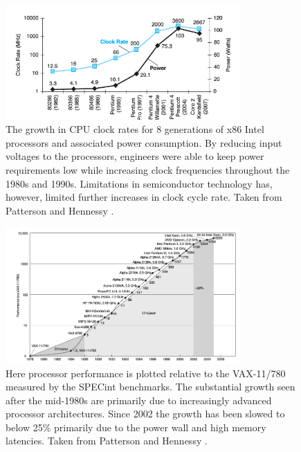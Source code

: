 \begin{figure}[ht!]
 \begin{mdframed}
  \centering
  \includegraphics[width=0.8\textwidth]{images/cpu_clocks.png}
  \caption[Power wall]{The growth in CPU clock rates for 8 generations of x86 Intel processors and associated power consumption. By reducing input voltages to the processors,
  engineers were able to keep power requirements low while increasing clock frequencies throughout the 1980s and 1990s. Limitations in semiconductor technology has, however,
  limited further increases in clock cycle rate. Taken from Patterson and Hennessy \cite[ch. 1]{patterson2009computer}.}
  \label{fig_clocks}
 \end{mdframed}
\end{figure}

\begin{figure}[ht!]
 \begin{mdframed}
  \centering
  \includegraphics[width=0.8\textwidth]{images/runtime_decrease_cpu.png}
  \caption[Program response time decline]{Here processor performance is plotted relative to the VAX-11/780 measured by the SPECint benchmarks. The substantial growth seen after the mid-1980s
  are primarily due to increasingly advanced processor architectures. Since 2002 the growth has been slowed to below 25\% primarily due to the power wall and high memory latencies. Taken from Patterson and Hennessy \cite[ch. 1]{patterson2009computer}.}
  \label{fig_runtime_decrease_cpu}
 \end{mdframed}
\end{figure}

